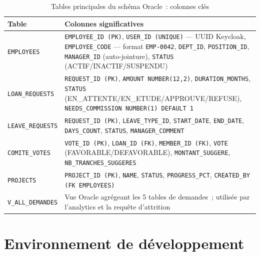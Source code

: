 \begin{table}[H]
\centering
\caption{Tables principales du schéma Oracle~: colonnes clés}
\label{tab:schema}
\begin{tabularx}{\textwidth}{|l|L|}
\hline
{}\textbf{Table} & \textbf{Colonnes significatives} \\\hline
{}
\texttt{EMPLOYEES} & \texttt{EMPLOYEE\_ID (PK)}, \texttt{USER\_ID (UNIQUE)} — UUID Keycloak, \texttt{EMPLOYEE\_CODE} — format \texttt{EMP-0042}, \texttt{DEPT\_ID}, \texttt{POSITION\_ID}, \texttt{MANAGER\_ID} (auto-jointure), \texttt{STATUS} (ACTIF/INACTIF/SUSPENDU) \\\hline
\texttt{LOAN\_REQUESTS} & \texttt{REQUEST\_ID (PK)}, \texttt{AMOUNT NUMBER(12,2)}, \texttt{DURATION\_MONTHS}, \texttt{STATUS} (EN\_ATTENTE/EN\_ETUDE/APPROUVE/REFUSE), \texttt{NEEDS\_COMMISSION NUMBER(1) DEFAULT 1} \\\hline
{}
\texttt{LEAVE\_REQUESTS} & \texttt{REQUEST\_ID (PK)}, \texttt{LEAVE\_TYPE\_ID}, \texttt{START\_DATE}, \texttt{END\_DATE}, \texttt{DAYS\_COUNT}, \texttt{STATUS}, \texttt{MANAGER\_COMMENT} \\\hline
\texttt{COMITE\_VOTES} & \texttt{VOTE\_ID (PK)}, \texttt{LOAN\_ID (FK)}, \texttt{MEMBER\_ID (FK)}, \texttt{VOTE} (FAVORABLE/DEFAVORABLE), \texttt{MONTANT\_SUGGERE}, \texttt{NB\_TRANCHES\_SUGGERES} \\\hline
{}
\texttt{PROJECTS} & \texttt{PROJECT\_ID (PK)}, \texttt{NAME}, \texttt{STATUS}, \texttt{PROGRESS\_PCT}, \texttt{CREATED\_BY (FK EMPLOYEES)} \\\hline
\texttt{V\_ALL\_DEMANDES} & Vue Oracle agrégeant les 5 tables de demandes~; utilisée par l'analytics et la requête d'attrition \\\hline
\end{tabularx}
\end{table}

\section{Environnement de développement}


